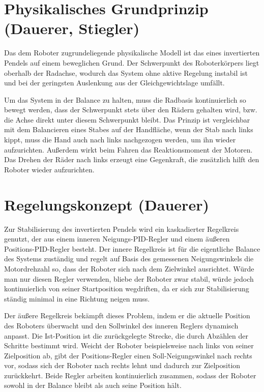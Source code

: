 \documentclass[fontsize=12pt,
parskip=half,	%
department=FakM,  %
logostyle=flat,
twoside, %
DIV=15,BCOR=10mm, %
]{OTHRreprt}
\begin{document}
\section{Physikalisches Grundprinzip (Dauerer, Stiegler)}
\label{sec:invertiertes_pendel}

Das dem Roboter zugrundeliegende physikalische Modell ist das eines invertierten Pendels 
auf einem beweglichen Grund. Der Schwerpunkt des Roboterkörpers 
liegt oberhalb der Radachse, wodurch das System ohne aktive Regelung instabil ist und bei der
geringsten Auslenkung aus der Gleichgewichtslage umfällt.


Um das System in der Balance zu halten, muss die Radbasis kontinuierlich 
so bewegt werden, dass der Schwerpunkt stets über den Rädern gehalten wird, 
bzw. die Achse direkt unter diesem Schwerpunkt bleibt.
Das Prinzip ist vergleichbar mit dem Balancieren eines Stabes auf der Handfläche, wenn der 
Stab nach links kippt, muss die Hand auch nach links nachgezogen werden, 
um ihn wieder aufzurichten. Außerdem wirkt beim Fahren das Reaktionsmoment der Motoren. Das Drehen der Räder nach links erzeugt eine Gegenkraft, die zusätzlich hilft den Roboter wieder
aufzurichten.

\section{Regelungskonzept (Dauerer)}
\label{sec:regelungskonzept}

Zur Stabilisierung des invertierten Pendels wird ein kaskadierter Regelkreis genutzt, der aus einem 
inneren Neigungs-PID-Regler und einem äußeren Positions-PID-Regler besteht. Der innere Regelkreis 
ist für die eigentliche Balance des Systems zuständig und regelt auf Basis des gemessenen Neigungswinkels 
die Motordrehzahl so, dass der Roboter sich nach dem Zielwinkel ausrichtet. Würde man nur diesen Regler
verwenden, bliebe der Roboter zwar stabil, würde jedoch kontinuierlich von seiner Startposition wegdriften,
da er sich zur Stabilisierung ständig minimal in eine Richtung neigen muss.

Der äußere Regelkreis bekämpft dieses Problem, indem er die aktuelle Position des Roboters überwacht 
und den Sollwinkel des inneren Reglers dynamisch anpasst. Die Ist-Position ist die zurückgelegte Strecke,
die durch Abzählen der Schritte bestimmt wird. 
Weicht der Roboter beispielsweise nach links von seiner Zielposition ab, gibt der Positions-Regler 
einen Soll-Neigungswinkel nach rechts vor, sodass sich der Roboter nach rechts lehnt und dadurch zur
Zielposition zurückkehrt. Beide Regler arbeiten kontinuierlich zusammen, sodass der Roboter sowohl 
in der Balance bleibt als auch seine Position hält.
\end{document}

